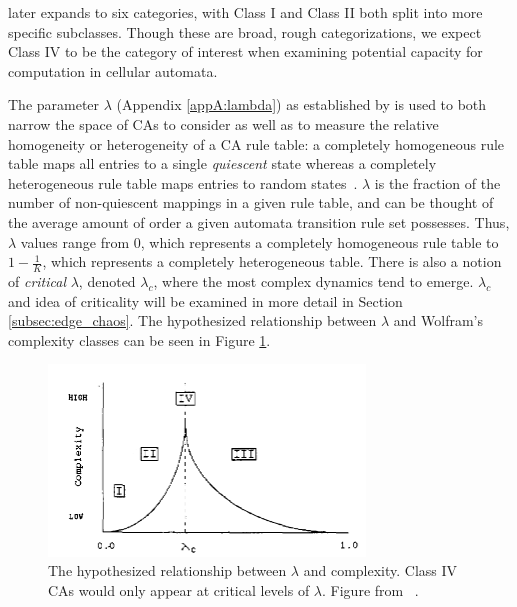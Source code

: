 \documentclass[a4paper,11pt]{report}
\begin{document}
\citeauthor{li90b} later expands to six categories, with Class I and Class II both split into more specific subclasses. Though these are broad, rough categorizations, we expect Class IV to be the category of interest when examining potential capacity for computation in cellular automata.

\medskip
The parameter $\lambda$ (Appendix \ref{appA:lambda}) as established by \citeauthor{la90} is used to both narrow the space of CAs to consider as well as to measure the relative homogeneity or heterogeneity of a CA rule table: a completely homogeneous rule table maps all entries to a single \textit{quiescent} state whereas a completely heterogeneous rule table maps entries to random states~\cite{la90}. $\lambda$ is the fraction of the number of non-quiescent mappings in a given rule table, and can be thought of the average amount of order a given automata transition rule set possesses. Thus, $\lambda$ values range from $0$, which represents a completely homogeneous rule table to $1 - \frac{1}{K}$, which represents a completely heterogeneous table. There is also a notion of \textit{critical} $\lambda$, denoted $\lambda_c$, where the most complex dynamics tend to emerge. $\lambda_c$ and idea of criticality will be examined in more detail in Section \ref{subsec:edge_chaos}. The hypothesized relationship between $\lambda$ and Wolfram's complexity classes can be seen in Figure \ref{fig:wolfram}.

\begin{figure}[htp]
	\centering
	\includegraphics[width=0.75\textwidth]{la90_fig16_wolfram_classes.png}
	\caption[Wolfram's Complexity Classes]{
	The hypothesized relationship between $\lambda$ and complexity. Class IV CAs would only appear at critical levels of $\lambda$. Figure from \citeauthor{la90}~\cite{la90}.
	}
	\label{fig:wolfram}
\end{figure}

\medskip
\end{document}
